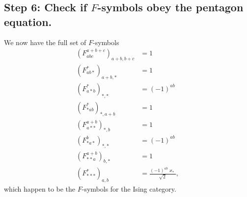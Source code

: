 \documentclass[aps,prb,twocolumn,superscriptaddress,noshowkeys]{revtex4-2}  %
\theoremstyle{plain}%
\theoremstyle{definition}
\theoremstyle{remark}
\begin{document}
\subsection*{Step 6: Check if $F$-symbols obey the pentagon equation.} 
We now have the full set of $F$-symbols
\begin{align*}
	\left(F_{abc}^{a+b+c}\right)_{a+b,b+c}&=1\\
	\left(F_{ab*}^*\right)_{a+b,*}&=1\\
	\left(F_{a*b}^*\right)_{*,*}&=(-1)^{ab}\\
	\left(F_{*ab}^*\right)_{*,a+b}&=1\\
	\left(F_{a**}^{a+b}\right)_{*,b}&=1\\
	\left(F_{*a*}^b\right)_{*,*}&=(-1)^{ab}\\
	\left(F_{**a}^{a+b}\right)_{b,*}&=1\\
	\left(F_{***}^*\right)_{a,b}&=\frac{(-1)^{ab}\varkappa_*}{\sqrt{2}},
\end{align*}
which happen to be the $F$-symbols for the Ising category. 
\end{document}
